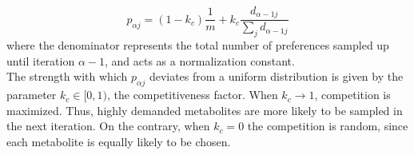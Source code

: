 \documentclass[12pt]{article}
\begin{document}
        	\begin{equation}\label{sampling_probability}
        		p_{{\alpha}j}= (1-k_c) \frac{1}{m}  + k_c \frac{d_{{\alpha} -1j}}{\sum_{j}d_{{\alpha}-1j}}
        	\end{equation}
        	where the denominator represents the total number of preferences sampled up until iteration $ {\alpha}-1 $, and acts as a normalization constant.\\
        	The strength with which $ p_{{\alpha}j} $ deviates from a uniform distribution is given by the parameter $ k_c \in [0, 1)$, the competitiveness factor. When $ k_c \rightarrow 1 $, competition is maximized. Thus, highly demanded metabolites are more likely to be sampled in the next iteration. On the contrary, when $ k_c = 0 $ the competition is random, since each metabolite is equally likely to be chosen. \par
        	
\end{document}
